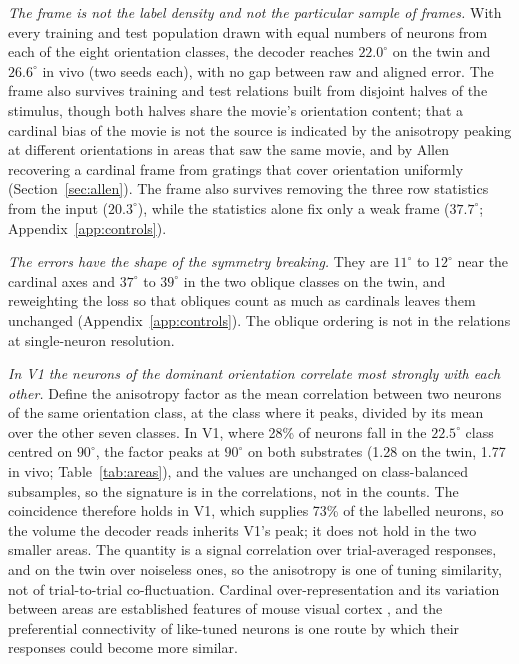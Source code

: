 \documentclass[11pt]{article}
\begin{document}
\emph{The frame is not the label density and not the particular sample of frames.} With every training and test population drawn with equal numbers of neurons from each of the eight orientation classes, the decoder reaches $22.0^\circ$ on the twin and $26.6^\circ$ in vivo (two seeds each), with no gap between raw and aligned error. The frame also survives training and test relations built from disjoint halves of the stimulus, though both halves share the movie's orientation content; that a cardinal bias of the movie is not the source is indicated by the anisotropy peaking at different orientations in areas that saw the same movie, and by Allen recovering a cardinal frame from gratings that cover orientation uniformly (Section~\ref{sec:allen}). The frame also survives removing the three row statistics from the input ($20.3^\circ$), while the statistics alone fix only a weak frame ($37.7^\circ$; Appendix~\ref{app:controls}).

\emph{The errors have the shape of the symmetry breaking.} They are $11^\circ$ to $12^\circ$ near the cardinal axes and $37^\circ$ to $39^\circ$ in the two oblique classes on the twin, and reweighting the loss so that obliques count as much as cardinals leaves them unchanged (Appendix~\ref{app:controls}). The oblique ordering is not in the relations at single-neuron resolution.

\emph{In V1 the neurons of the dominant orientation correlate most strongly with each other.} Define the anisotropy factor as the mean correlation between two neurons of the same orientation class, at the class where it peaks, divided by its mean over the other seven classes. In V1, where 28\% of neurons fall in the $22.5^\circ$ class centred on $90^\circ$, the factor peaks at $90^\circ$ on both substrates (1.28 on the twin, 1.77 in vivo; Table~\ref{tab:areas}), and the values are unchanged on class-balanced subsamples, so the signature is in the correlations, not in the counts. The coincidence therefore holds in V1, which supplies 73\% of the labelled neurons, so the volume the decoder reads inherits V1's peak; it does not hold in the two smaller areas. The quantity is a signal correlation over trial-averaged responses, and on the twin over noiseless ones, so the anisotropy is one of tuning similarity, not of trial-to-trial co-fluctuation. Cardinal over-representation and its variation between areas are established features of mouse visual cortex \citep{roth2012,fahey2019}, and the preferential connectivity of like-tuned neurons \citep{ko2011} is one route by which their responses could become more similar.
\end{document}
